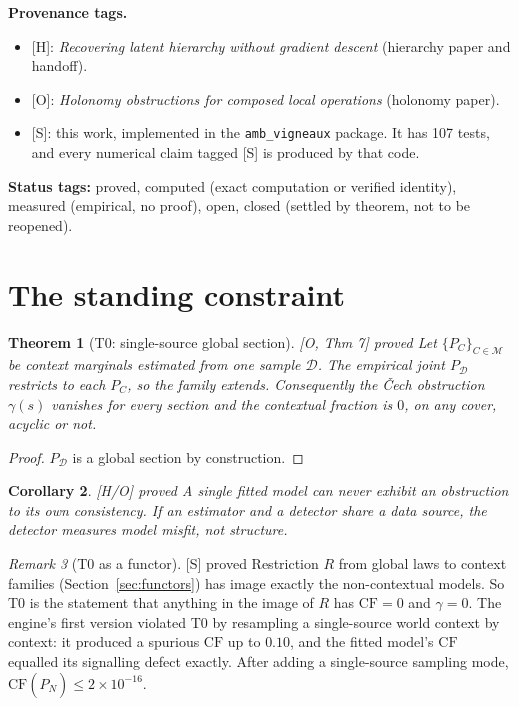 \documentclass[11pt]{article}
\newtheorem{theorem}{Theorem}[section]
\newtheorem{corollary}[theorem]{Corollary}
\theoremstyle{definition}
\theoremstyle{remark}
\newtheorem{remark}[theorem]{Remark}
\newcommand{\CF}{\mathrm{CF}}
\newcommand{\src}[1]{\textsf{\small[#1]}}
\newcommand{\st}[1]{\textsf{\small\color{gray}#1}}
\begin{document}
\noindent\textbf{Provenance tags.}
\begin{itemize}
  \item \src{H}: \emph{Recovering latent hierarchy without gradient descent} (hierarchy paper and handoff).
  \item \src{O}: \emph{Holonomy obstructions for composed local operations} (holonomy paper).
  \item \src{S}: this work, implemented in the \texttt{amb\_vigneaux} package. It has 107 tests, and every numerical claim tagged \src{S} is produced by that code.
\end{itemize}
\noindent\textbf{Status tags:} \st{proved}, \st{computed} (exact computation or verified identity), \st{measured} (empirical, no proof), \st{open}, \st{closed} (settled by theorem, not to be reopened).

\tableofcontents
\newpage

\section{The standing constraint}

\begin{theorem}[T0: single-source global section]\label{thm:T0}
\src{O, Thm 7} \st{proved}
Let $\{P_C\}_{C\in\mathcal M}$ be context marginals estimated from one sample $\mathcal D$. The empirical joint $P_{\mathcal D}$ restricts to each $P_C$, so the family extends. Consequently the \v{C}ech obstruction $\gamma(s)$ vanishes for every section and the contextual fraction is $0$, on any cover, acyclic or not.
\end{theorem}
\begin{proof}
$P_{\mathcal D}$ is a global section by construction.
\end{proof}

\begin{corollary}\label{cor:T0}
\src{H/O} \st{proved}
A single fitted model can never exhibit an obstruction to its own consistency. If an estimator and a detector share a data source, the detector measures model misfit, not structure.
\end{corollary}

\begin{remark}[T0 as a functor]
\src{S} \st{proved}
Restriction $R$ from global laws to context families (Section~\ref{sec:functors}) has image exactly the non-contextual models. So T0 is the statement that anything in the image of $R$ has $\CF=0$ and $\gamma=0$. The engine's first version violated T0 by resampling a single-source world context by context: it produced a spurious $\CF$ up to $0.10$, and the fitted model's $\CF$ equalled its signalling defect exactly. After adding a single-source sampling mode, $\CF(\hat P_N)\le2\times10^{-16}$.
\end{remark}
\end{document}
